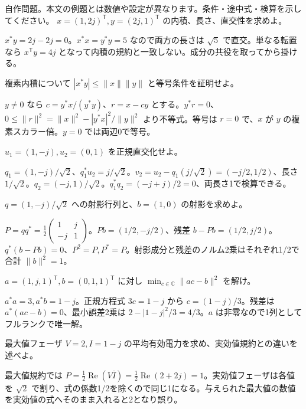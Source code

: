 \documentclass[11pt]{article}
\begin{document}
自作問題。本文の例題とは数値や設定が異なります。条件・途中式・検算を示してください。
\problem[共役内積]
$x=(1,2j)^{\mathsf T},y=(2j,1)^{\mathsf T}$ の内積、長さ、直交性を求めよ。
\begin{ans}
$x^*y=2j-2j=0$。$x^*x=y^*y=5$ なので両方の長さは $\sqrt5$ で直交。単なる転置なら $x^{\mathsf T}y=4j$ となって内積の規約と一致しない。成分の共役を取ってから掛ける。
\end{ans}
複素内積について $|x^*y|\le\|x\|\|y\|$ と等号条件を証明せよ。
\begin{ans}
$y\ne0$ なら $c=y^*x/(y^*y)$、$r=x-cy$ とする。$y^*r=0$、$0\le\|r\|^2=\|x\|^2-|y^*x|^2/\|y\|^2$ より不等式。等号は $r=0$ で、$x$ が $y$ の複素スカラー倍。$y=0$ では両辺0で等号。
\end{ans}
\newpage
{}
$u_1=(1,-j),u_2=(0,1)$ を正規直交化せよ。
\begin{ans}
$q_1=(1,-j)/\sqrt2$、$q_1^*u_2=j/\sqrt2$。$v_2=u_2-q_1(j/\sqrt2)=(-j/2,1/2)$、長さ $1/\sqrt2$。$q_2=(-j,1)/\sqrt2$。$q_1^*q_2=(-j+j)/2=0$、両長さ1で検算できる。
\end{ans}
\problem[射影行列]
$q=(1,-j)/\sqrt2$ への射影行列と、$b=(1,0)$ の射影を求めよ。
\begin{ans}
$P=qq^*=\frac12\begin{pmatrix}1&j\\-j&1\end{pmatrix}$。$Pb=(1/2,-j/2)$、残差 $b-Pb=(1/2,j/2)$。$q^*(b-Pb)=0$、$P^2=P,P^*=P$。射影成分と残差のノルム2乗はそれぞれ1/2で合計 $\|b\|^2=1$。
\end{ans}
\newpage
\problem[複素最小二乗]
$a=(1,j,1)^{\mathsf T},b=(0,1,1)^{\mathsf T}$ に対し $\min_{c\in\mathbb C}\|ac-b\|^2$ を解け。
\begin{ans}
$a^*a=3,a^*b=1-j$。正規方程式 $3c=1-j$ から $c=(1-j)/3$。残差は $a^*(ac-b)=0$、最小誤差2乗は $2-|1-j|^2/3=4/3$。$a$ は非零なので1列としてフルランクで唯一解。
\end{ans}
\problem[最大値フェーザの電力]
最大値フェーザ $V=2,I=1-j$ の平均有効電力を求め、実効値規約との違いを述べよ。
\begin{ans}
最大値規約では $P=\frac12\operatorname{Re}(V\overline I)=\frac12\operatorname{Re}(2+2j)=1$。実効値フェーザは各値を $\sqrt2$ で割り、式の係数1/2を除くので同じ1になる。与えられた最大値の数値を実効値の式へそのまま入れると2となり誤り。
\end{ans}
\end{document}

